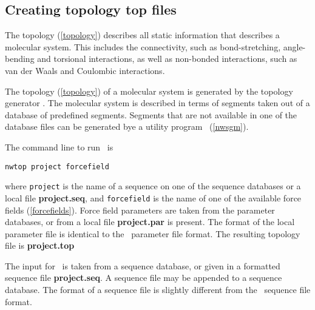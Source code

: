 \subsection{Creating topology {\bf top} files}
\label{nwtop}
\par
The topology (\ref{topology}) describes all static information
that describes a molecular system. This includes the connectivity, such
as bond-stretching, angle-bending and torsional interactions, as well as
non-bonded interactions, such as van der Waals and Coulombic interactions.
\par
The topology (\ref{topology}) of a molecular system is 
generated by the topology generator \nwtop. The molecular system
is described in terms of segments taken out of a database of predefined
segments. Segments that are not available in one of the database files
can be generated bye a utility program \nwsgm\ (\ref{nwsgm}).
\par
The command line to run \nwtop\ is
\begin{verbatim}
nwtop project forcefield
\end{verbatim}
where {\tt project} is the name of a sequence on one of the
sequence databases or a local file {\bf project.seq}, and
{\tt forcefield} is the name of one of the 
available force fields (\ref{forcefields}).
Force field parameters are taken from the parameter databases,
or from a local file {\bf project.par} is present. The 
format of the local parameter file is identical to the 
\argos\ parameter file format.
The resulting topology file is {\bf project.top}
\par
The input for \nwtop\ is taken from a sequence database, or
given in a formatted sequence file {\bf project.seq}. A sequence
file may be appended to a sequence database. The 
format of a sequence file is slightly different from the \argos\ 
sequence file format.
